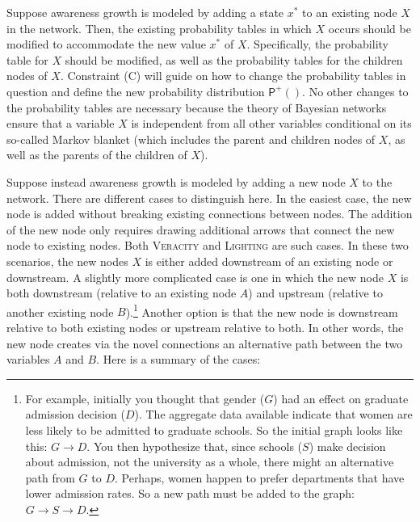 \documentclass[
  11pt,
  dvipsnames,enabledeprecatedfontcommands]{scrartcl}
\newcommand{\ppr}[2]{\ensuremath{\mathsf{P}^{#1}(#2)}}
\begin{document}
Suppose awareness growth is modeled by adding a state \(x^*\) to an
existing node \(X\) in the network. Then, the existing probability
tables in which \(X\) occurs should be modified to accommodate the new
value \(x^*\) of \(X\). Specifically, the probability table for \(X\)
should be modified, as well as the probability tables for the children
nodes of \(X\). Constraint (C) will guide on how to change the
probability tables in question and define the new probability
distribution \(\ppr{+}{}\). No other changes to the probability tables
are necessary because the theory of Bayesian networks ensure that a
variable \(X\) is independent from all other variables conditional on
its so-called Markov blanket (which includes the parent and children
nodes of \(X\), as well as the parents of the children of \(X\)).

Suppose instead awareness growth is modeled by adding a new node \(X\)
to the network. There are different cases to distinguish here. In the
easiest case, the new node is added without breaking existing
connections between nodes. The addition of the new node only requires
drawing additional arrows that connect the new node to existing nodes.
Both \textsc{Veracity} and \textsc{Lighting} are such cases. In these
two scenarios, the new nodes \(X\) is either added downstream of an
existing node or downstream. A slightly more complicated case is one in
which the new node \(X\) is both downstream (relative to an existing
node \(A\)) and upstream (relative to another existing node
\(B\)).\footnote{For example, initially you thought that gender (\(G\))
  had an effect on graduate admission decision (\(D\)). The aggregate
  data available indicate that women are less likely to be admitted to
  graduate schools. So the initial graph looks like this:
  \(G \rightarrow D\). You then hypothesize that, since schools (\(S\))
  make decision about admission, not the university as a whole, there
  might an alternative path from \(G\) to \(D\). Perhaps, women happen
  to prefer departments that have lower admission rates. So a new path
  must be added to the graph: \(G \rightarrow S \rightarrow D\).}
Another option is that the new node is downstream relative to both
existing nodes or upstream relative to both. In other words, the new
node creates via the novel connections an alternative path between the
two variables \(A\) and \(B\). Here is a summary of the cases:
\end{document}
